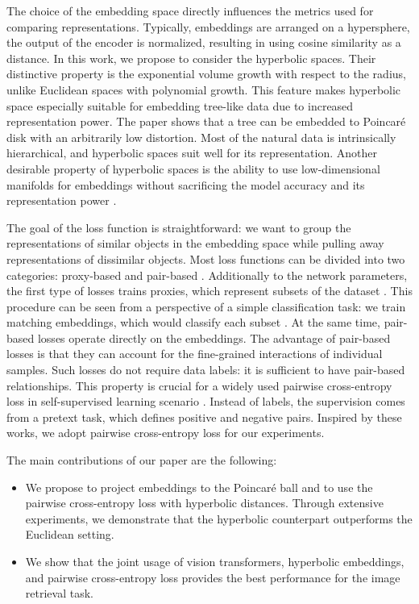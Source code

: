 \documentclass[10pt,twocolumn,letterpaper]{article}
\begin{document}
The choice of the embedding space directly influences the metrics used for comparing representations. Typically, embeddings are arranged on a hypersphere, \ie the output of the encoder is  normalized, resulting in using cosine similarity as a distance. In this work, we propose to consider the hyperbolic spaces. Their distinctive property is the exponential volume growth with respect to the radius, unlike Euclidean spaces with polynomial growth. This feature makes hyperbolic space especially suitable for embedding tree-like data due to increased representation power. The paper \cite{sarkar2011low} shows that a tree can be embedded to Poincar\'e disk with an arbitrarily low distortion. Most of the natural data is intrinsically hierarchical, and hyperbolic spaces suit well for its representation. Another desirable property of hyperbolic spaces is the ability to use low-dimensional manifolds for embeddings without sacrificing the model accuracy and its representation power \cite{nickel2017poincare}. 

The goal of the loss function is straightforward: we want to group the representations of similar objects in the embedding space while pulling away representations of dissimilar objects. Most loss functions can be divided into two categories: proxy-based and pair-based \cite{proxy_anchor}. Additionally to the network parameters, the first type of losses trains proxies, which represent subsets of the dataset \cite{ProxyNCA}. This procedure can be seen from a perspective of a simple classification task: we train matching embeddings, which would classify each subset \cite{reality_check}. At the same time, pair-based losses operate directly on the embeddings. The advantage of pair-based losses is that they can account for the fine-grained interactions of individual samples. Such losses do not require data labels: it is sufficient to have pair-based relationships. This property is crucial for a widely used pairwise cross-entropy loss in self-supervised learning scenario \cite{CPC,moco,simclr}. Instead of labels, the supervision comes from a pretext task, which defines positive and negative pairs. Inspired by these works, we adopt pairwise cross-entropy loss for our experiments.

The main contributions of our paper are the following:
\begin{itemize}
\item We propose to project embeddings to the Poincar\'e ball and to use the pairwise cross-entropy loss with hyperbolic distances. Through extensive experiments, we demonstrate that the hyperbolic counterpart outperforms the Euclidean setting.
    \item We show that the joint usage of vision transformers, hyperbolic embeddings, and pairwise cross-entropy loss provides the best performance for the image retrieval task.
\end{itemize}
\end{document}
